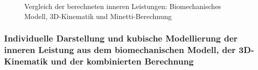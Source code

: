 \documentclass[
  letterpaper,
  DIV=11]{scrartcl}
\begin{document}
\begin{figure}


\caption{\label{fig-Vergleich_PInt_Kin_Mod}Vergleich der berechneten
inneren Leistungen: Biomechanisches Modell, 3D-Kinematik und
Minetti-Berechnung}

\end{figure}%

\subsubsection{Individuelle Darstellung und kubische Modellierung der
inneren Leistung aus dem biomechanischen Modell, der 3D-Kinematik und
der kombinierten
Berechnung}\label{individuelle-darstellung-und-kubische-modellierung-der-inneren-leistung-aus-dem-biomechanischen-modell-der-3d-kinematik-und-der-kombinierten-berechnung}
\end{document}
